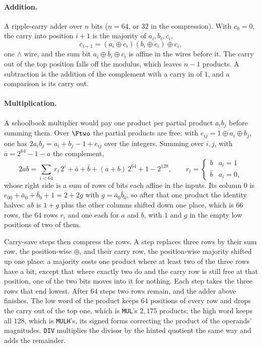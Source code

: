 \paragraph{Addition.} A ripple-carry adder over $n$ bits ($n=64$, or $32$ in the compression). With $c_0=0$, the carry into position $i+1$ is the majority of $a_i,b_i,c_i$,
\[
c_{i+1}=(a_i\oplus c_i)(b_i\oplus c_i)\oplus c_i ,
\]
one $\wedge$ wire, and the sum bit $a_i\oplus b_i\oplus c_i$ is affine in the wires before it. The carry out of the top position falls off the modulus, which leaves $n-1$ products. A subtraction is the addition of the complement with a carry in of $1$, and a comparison is its carry out.

\paragraph{Multiplication.} A schoolbook multiplier would pay one product per partial product $a_ib_j$ before summing them. Over $\Ftwo$ the partial products are free: with $e_{ij}=1\oplus a_i\oplus b_j$, one has $2a_ib_j=a_i+b_j-1+e_{ij}$ over the integers. Summing over $i,j$, with $\bar a=2^{64}-1-a$ the complement,
\[
2ab=\sum_{i<64}r_i\,2^{i}+\bar a+\bar b+(a+b)\,2^{64}+1-2^{128},\qquad r_i=\begin{cases}b&a_i=1\\ \bar b&a_i=0,\end{cases}
\]
whose right side is a sum of rows of bits each affine in the inputs. Its column $0$ is $e_{00}+\bar a_0+\bar b_0+1=2+2g$ with $g=\bar a_0\bar b_0$, so after that one product the identity halves: $ab$ is $1+g$ plus the other columns shifted down one place, which is $66$ rows, the $64$ rows $r_i$ and one each for $a$ and $b$, with $1$ and $g$ in the empty low positions of two of them.

Carry-save steps then compress the rows. A step replaces three rows by their sum row, the position-wise $\oplus$, and their carry row, the position-wise majority shifted up one place: a majority costs one product where at least two of the three rows have a bit, except that where exactly two do and the carry row is still free at that position, one of the two bits moves into it for nothing. Each step takes the three rows that end lowest. After $64$ steps two rows remain, and the adder above finishes. The low word of the product keeps $64$ positions of every row and drops the carry out of the top one, which is \texttt{MUL}'s $2{,}175$ products; the high word keeps all $128$, which is \texttt{MULH}'s, its signed forms correcting the product of the operands' magnitudes. \texttt{DIV} multiplies the divisor by the hinted quotient the same way and adds the remainder.

